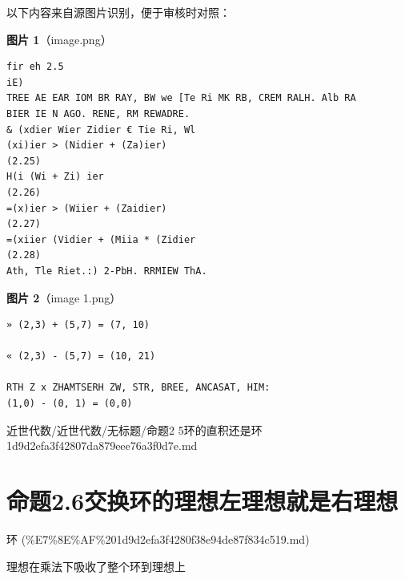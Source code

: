 \begin{note}
以下内容来自源图片识别，便于审核时对照：

\textbf{图片 1}（image.png）
\begin{Verbatim}[fontsize=\small]
fir eh 2.5
iE)
TREE AE EAR IOM BR RAY, BW we [Te Ri MK RB, CREM RALH. Alb RA
BIER IE N AGO. RENE, RM REWADRE.
& (xdier Wier Zidier € Tie Ri, Wl
(xi)ier > (Nidier + (Za)ier)                                                (2.25)
H(i (Wi + Zi) ier                                                         (2.26)
=(x)ier > (Wiier + (Zaidier)                                                (2.27)
=(xiier (Vidier + (Miia * (Zidier                                        (2.28)
Ath, Tle Riet.:) 2-PbH. RRMIEW ThA.
\end{Verbatim}

\textbf{图片 2}（image 1.png）
\begin{Verbatim}[fontsize=\small]
» (2,3) + (5,7) = (7, 10)

« (2,3) - (5,7) = (10, 21)

RTH Z x ZHAMTSERH ZW, STR, BREE, ANCASAT, HIM:
(1,0) - (0, 1) = (0,0)
\end{Verbatim}

\end{note}

\begin{note}[来源路径]

近世代数/近世代数/无标题/命题2 5环的直积还是环 1d9d2efa3f42807da879eee76a3f0d7e.md

\end{note}

\section*{命题2.6交换环的理想左理想就是右理想}

\begin{note}[来源上级主题]

环 (\%E7\%8E\%AF\%201d9d2efa3f4280f38e94de87f834c519.md)

\end{note}

\begin{proposition}[命题2.6交换环的理想左理想就是右理想]

理想在乘法下吸收了整个环到理想上

\end{proposition}

